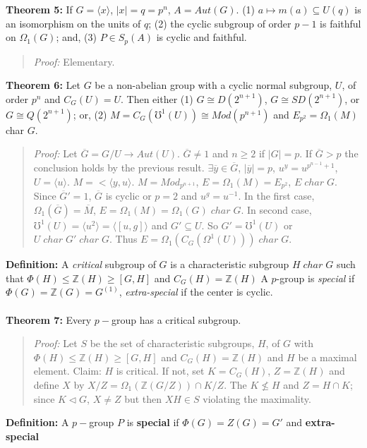 {\bf Theorem 5:} If $G = \langle x \rangle $, $|x|=q=p^n$, $A=Aut(G)$.
(1) $a \mapsto m(a) \subseteq U(q)$ is an isomorphism on the units of $q$;
(2) the cyclic subgroup of order $p-1$ is faithful on $\Omega_1(G)$; and,
(3) $P \in S_p(A)$ is cyclic and faithful.
\begin{quote}
\emph{Proof:}  Elementary.
\end{quote}
{\bf Theorem 6:}  
Let $G$ be a non-abelian group with a cyclic normal subgroup, $U$,
of order $p^{n}$ and $C_G(U)=U$.  Then either
(1)
$G \cong D(2^{n+1})$, $G \cong SD(2^{n+1})$, or $G \cong Q(2^{n+1})$; or, 
(2) $M=C_G(\mho^1(U)) \cong Mod(p^{n+1})$ and $E_{p^2}= \Omega_1(M)$ char $G$.
\begin{quote}
\emph{Proof:}  
Let ${\overline G}= G/U \rightarrow Aut(U)$.  ${\overline G} \ne 1$ and $n \ge 2$ if
$|G|=p$.  If ${\overline G} > p$ the conclusion holds by the previous result.
$\exists {\overline y} \in {\overline G}$, $|{\overline y}|=p$, $u^y= u^{p^{n-1}+1}$, 
$U= \langle u \rangle $.
$M= < \langle y,u \rangle $.  
$M=Mod_{p^{n+1}}$, $E= \Omega_1(M)= E_{p^2}$, $E \; char \; G$.  Since
${\overline G}'=1$, ${\overline G}$ is cyclic or $p=2$ and $u^g= u^{-1}$.   In the first case,
$\Omega_1({\overline G})= {\overline M}$, $E= \Omega_1(M)= \Omega_1(G) \; char \; G$.
In second case, $\mho^1(U)= \langle u^2 \rangle = \langle [u,g] \rangle $ 
and $G' \subseteq U$.  So
$G' = \mho^1(U)$ or $U \; char \; G' \; char \; G$.  
Thus $E= \Omega_1(C_G(\Omega^1(U))) \; char \; G$.
\end{quote}
{\bf Definition:}  A \emph{critical} subgroup of $G$ is a characteristic subgroup
$H \; char \; G$ such that $\Phi(H) \le {\mathbb Z}(H) \ge [G, H]$ and $C_G(H)= {\mathbb Z}(H)$
A $p$-group is \emph{special} if $\Phi(G)= {\mathbb Z}(G) = G^{(1)}$, \emph{extra-special}
if the center is cyclic.
\\
\\
{\bf Theorem 7:}
Every $p-$group has a critical subgroup.
\begin{quote}
\emph{Proof:} Let $S$ be the set of characteristic subgroups, $H$, of $G$ with
$\Phi(H) \le {\mathbb Z}(H) \ge [G, H]$ and $C_G(H)= {\mathbb Z}(H)$ and $H$ be a maximal
element.  Claim: $H$ is critical.  If not, set $K= C_G(H)$, $Z= {\mathbb Z}(H)$ and
define $X$ by $X/Z= \Omega_1({\mathbb Z}(G/Z)) \cap K/Z$.  The $K \nleq H$ and
$Z= H \cap K$; since $K \lhd G$, $X \ne Z$ but then $XH \in S$ violating the maximality.
\end{quote}
{\bf Definition:}
A $p-$group $P$ is {\bf special} if $\Phi(G)=Z(G)=G'$ and {\bf extra-special}
